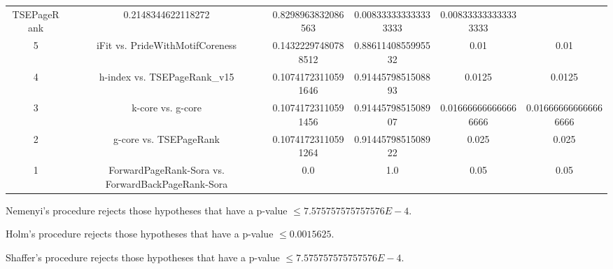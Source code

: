 \documentclass[a4paper,10pt]{article}
\begin{document}
\begin{landscape}
\begin{table}[!htp]
\begin{tabular}{cccccc}
TSEPageRank&0.2148344622118272&0.8298963832086563&0.008333333333333333&0.008333333333333333\\5&iFit vs. PrideWithMotifCoreness&0.14322297480788512&0.8861140855995532&0.01&0.01\\4&h-index vs. TSEPageRank_v15&0.10741723110591646&0.9144579851508893&0.0125&0.0125\\3&k-core vs. g-core&0.10741723110591456&0.9144579851508907&0.016666666666666666&0.016666666666666666\\2&g-core vs. TSEPageRank&0.10741723110591264&0.9144579851508922&0.025&0.025\\1&ForwardPageRank-Sora vs. ForwardBackPageRank-Sora&0.0&1.0&0.05&0.05\\\hline
\end{tabular}
\end{table}
Nemenyi's procedure rejects those hypotheses that have a p-value $\le7.575757575757576E-4$.


Holm's procedure rejects those hypotheses that have a p-value $\le0.0015625$.


Shaffer's procedure rejects those hypotheses that have a p-value $\le7.575757575757576E-4$.



\end{landscape}
\end{document}
